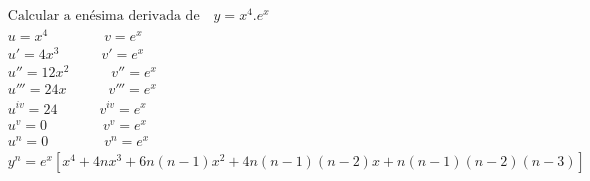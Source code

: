\begin{ex}
\begin{align}
&\text{Calcular a enésima derivada de} \quad y=x^4.e^{x}\nonumber\\
&u = x^4 \quad\quad\quad\quad v=e^{x}\nonumber\\
&u'=4x^3 \quad\quad\quad v'=e^{x}\nonumber\\
&u''=12x^2 \quad\quad\quad v''=e^{x}\nonumber\\
&u'''=24x \quad\quad\quad v'''=e^{x}\nonumber\\
&u^{iv}=24 \quad\quad\quad v^{iv}=e^{x}\nonumber\\
&u^{v}=0 \quad\quad\quad\quad v^{v}=e^{x}\nonumber\\
&u^{n}=0 \quad\quad\quad\quad v^{n}=e^{x}\nonumber\\
&y^{n}=e^{x}[x^4+4nx^3+6n(n-1)x^2+4n(n-1)(n-2)x+n(n-1)(n-2)(n-3)]\nonumber
\end{align}
\end{ex}
